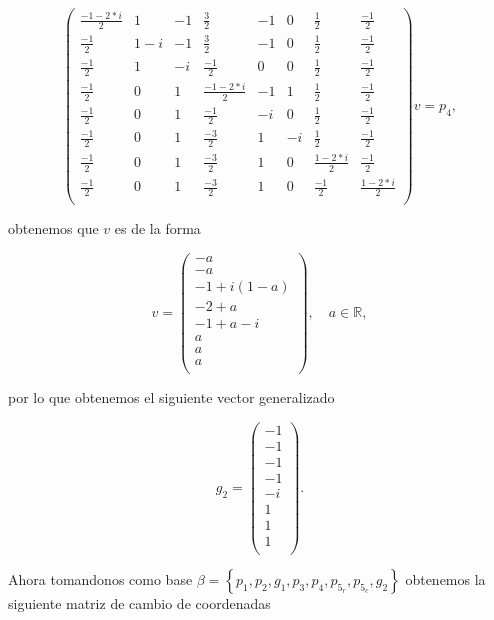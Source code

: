 \documentclass[letterpaper]{article}
\theoremstyle{definition}
\theoremstyle{lemathm}
\theoremstyle{lemademthm}
\newcommand{\pars}[1]{\left( #1 \right) }
\newcommand{\set}[1]{\left \{ #1 \right\} }
\newcommand{\RR}{\mathbb{R}}
\newcommand{\1}{\mathbbm{1}}
\begin{document}
\begin{enumerate}
		\[\pars{\begin{array}{cccccccc}
			\frac{-1-2*i}{2} & 1 & -1 & \frac{3}{2} & -1 & 0 & \frac{1}{2} & \frac{-1}{2} \\[1ex]
			\frac{-1}{2} & 1-i & -1 & \frac{3}{2} & -1 & 0 & \frac{1}{2} & \frac{-1}{2} \\[1ex]
			\frac{-1}{2} & 1 & -i & \frac{-1}{2} & 0 & 0 & \frac{1}{2} & \frac{-1}{2} \\[1ex]
			\frac{-1}{2} & 0 & 1 & \frac{-1-2*i}{2} & -1 & 1 & \frac{1}{2} & \frac{-1}{2} \\[1ex]
			\frac{-1}{2} & 0 & 1 & \frac{-1}{2} & -i & 0 & \frac{1}{2} & \frac{-1}{2} \\[1ex]
			\frac{-1}{2} & 0 & 1 & \frac{-3}{2} & 1 & -i & \frac{1}{2} & \frac{-1}{2} \\[1ex]
			\frac{-1}{2} & 0 & 1 & \frac{-3}{2} & 1 & 0 & \frac{1-2*i}{2} & \frac{-1}{2} \\[1ex]
			\frac{-1}{2} & 0 & 1 & \frac{-3}{2} & 1 & 0 & \frac{-1}{2} & \frac{1-2*i}{2}\\
		\end{array}}v = p_4,\]

		obtenemos que $v$ es de la forma

		\[v = \pars{\begin{array}{c}
			-a\\[1ex]
			-a\\[1ex]
			-1 + i(1-a)\\[1ex]
			-2 + a\\[1ex]
			-1 + a - i\\[1ex]
			a\\[1ex]
			a\\[1ex]
			a\\
		\end{array}}, \quad a\in\RR,\]

		por lo que obtenemos el siguiente vector generalizado

		\[g_2 = \pars{\begin{array}{c}
			-1\\[1ex]
			-1\\[1ex]
			-1\\[1ex]
			-1\\[1ex]
			-i\\[1ex]
			1\\[1ex]
			1\\[1ex]
			1\\
		\end{array}}.\]

		Ahora tomandonos como base $\beta = \set{p_1,p_2,g_1,p_3,p_4,p_{5_r},p_{5_c},g_2}$ obtenemos la siguiente matriz de cambio de coordenadas


\end{enumerate}
\end{document}
